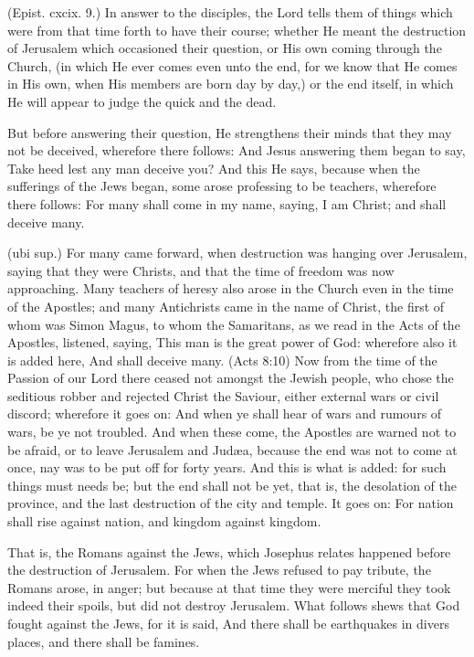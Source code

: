  (Epist. cxcix. 9.) In answer to the disciples, the Lord tells them of things which were from that time forth to have their course; whether He meant the destruction of Jerusalem which occasioned their question, or His own coming through the Church, (in which He ever comes even unto the end, for we know that He comes in His own, when His members are born day by day,) or the end itself, in which He will appear to judge the quick and the dead.

 But before answering their question, He strengthens their minds that they may not be deceived, wherefore there follows: And Jesus answering them began to say, Take heed lest any man deceive you? And this He says, because when the sufferings of the Jews began, some arose professing to be teachers, wherefore there follows: For many shall come in my name, saying, I am Christ; and shall deceive many.

 (ubi sup.) For many came forward, when destruction was hanging over Jerusalem, saying that they were Christs, and that the time of freedom was now approaching. Many teachers of heresy also arose in the Church even in the time of the Apostles; and many Antichrists came in the name of Christ, the first of whom was Simon Magus, to whom the Samaritans, as we read in the Acts of the Apostles, listened, saying, This man is the great power of God: wherefore also it is added here, And shall deceive many. (Acts 8:10) Now from the time of the Passion of our Lord there ceased not amongst the Jewish people, who chose the seditious robber and rejected Christ the Saviour, either external wars or civil discord; wherefore it goes on: And when ye shall hear of wars and rumours of wars, be ye not troubled. And when these come, the Apostles are warned not to be afraid, or to leave Jerusalem and Judæa, because the end was not to come at once, nay was to be put off for forty years. And this is what is added: for such things must needs be; but the end shall not be yet, that is, the desolation of the province, and the last destruction of the city and temple. It goes on: For nation shall rise against nation, and kingdom against kingdom.

 That is, the Romans against the Jews, which Josephus relates happened before the destruction of Jerusalem. For when the Jews refused to pay tribute, the Romans arose, in anger; but because at that time they were merciful they took indeed their spoils, but did not destroy Jerusalem. What follows shews that God fought against the Jews, for it is said, And there shall be earthquakes in divers places, and there shall be famines.

